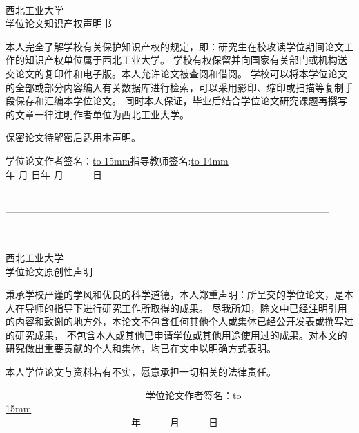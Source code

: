 \newpage
\mbox{}
\newpage
\thispagestyle{empty}

\text{}\\
\begin{center}{西北工业大学\\学位论文知识产权声明书}\end{center}

    本人完全了解学校有关保护知识产权的规定，即：研究生在校攻读学位期间论文工作的知识产权单位属于西北工业大学。
    学校有权保留并向国家有关部门或机构送交论文的复印件和电子版。本人允许论文被查阅和借阅。
    学校可以将本学位论文的全部或部分内容编入有关数据库进行检索，可以采用影印、缩印或扫描等复制手段保存和汇编本学位论文。
    同时本人保证，毕业后结合学位论文研究课题再撰写的文章一律注明作者单位为西北工业大学。

    保密论文待解密后适用本声明。

\begin{flushleft}
\quad\quad 学位论文作者签名：\underline{\hbox to 15mm{}}\quad\quad\quad 指导教师签名:\underline{\hbox to 14mm{}}\\
\quad\quad\quad\quad\quad\quad\quad\quad 年 \quad 月 \quad 日\quad\quad\quad\quad\quad\quad\quad\quad\quad\quad 年 \quad\quad 月~~~~~~日~~~~
\end{flushleft}
\text{}\\



-----------------------------------------------------------------------------------------------------

\text{}\\


\begin{center}{西北工业大学\\学位论文原创性声明}\end{center}

 秉承学校严谨的学风和优良的科学道德，本人郑重声明：所呈交的学位论文，是本人在导师的指导下进行研究工作所取得的成果。
 尽我所知，除文中已经注明引用的内容和致谢的地方外，本论文不包含任何其他个人或集体已经公开发表或撰写过的研究成果，
 不包含本人或其他已申请学位或其他用途使用过的成果。对本文的研究做出重要贡献的个人和集体，均已在文中以明确方式表明。

本人学位论文与资料若有不实，愿意承担一切相关的法律责任。

\begin{flushright}

~~~~~~~~~~~~~~~~~~~~~~~~~~~~~学位论文作者签名：\underline{\hbox to 15mm{}}~~~~~~~~~~~~~~~~~~~~~~~~~~~~~~\\
~~~~~~~~~~~~~~~~~~~~~~~~~~年~~~~~~月~~~~~~日~~~~~~~~~~~~~~~~~~~~~~~~~~~~~~
\end{flushright} 